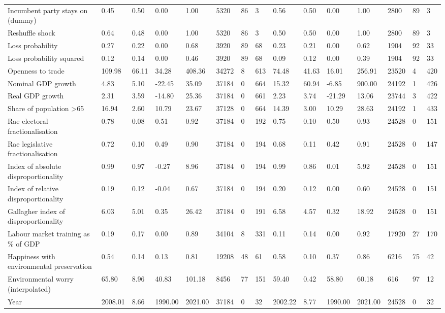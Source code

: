 \begin{longtable}{lllllllllllllll}
Incumbent party stays on (dummy) & 0.45 & 0.50 & 0.00 & 1.00 & 5320 & 86 & 3 & 0.56 & 0.50 & 0.00 & 1.00 & 2800 & 89 & 3\\
Reshuffle shock & 0.64 & 0.48 & 0.00 & 1.00 & 5320 & 86 & 3 & 0.50 & 0.50 & 0.00 & 1.00 & 2800 & 89 & 3\\
\addlinespace
Loss probability & 0.27 & 0.22 & 0.00 & 0.68 & 3920 & 89 & 68 & 0.23 & 0.21 & 0.00 & 0.62 & 1904 & 92 & 33\\
Loss probability squared & 0.12 & 0.14 & 0.00 & 0.46 & 3920 & 89 & 68 & 0.09 & 0.12 & 0.00 & 0.39 & 1904 & 92 & 33\\
Openness to trade & 109.98 & 66.11 & 34.28 & 408.36 & 34272 & 8 & 613 & 74.48 & 41.63 & 16.01 & 256.91 & 23520 & 4 & 420\\
Nominal GDP growth & 4.83 & 5.10 & -22.45 & 35.09 & 37184 & 0 & 664 & 15.32 & 60.94 & -6.85 & 900.00 & 24192 & 1 & 426\\
Real GDP growth & 2.31 & 3.59 & -14.80 & 25.36 & 37184 & 0 & 661 & 2.23 & 3.74 & -21.29 & 13.06 & 23744 & 3 & 422\\
\addlinespace
Share of population >65 & 16.94 & 2.60 & 10.79 & 23.67 & 37128 & 0 & 664 & 14.39 & 3.00 & 10.29 & 28.63 & 24192 & 1 & 433\\
Rae electoral fractionalisation & 0.78 & 0.08 & 0.51 & 0.92 & 37184 & 0 & 192 & 0.75 & 0.10 & 0.50 & 0.93 & 24528 & 0 & 151\\
Rae legislative fractionalisation & 0.72 & 0.10 & 0.49 & 0.90 & 37184 & 0 & 194 & 0.68 & 0.11 & 0.42 & 0.91 & 24528 & 0 & 147\\
Index of absolute disproportionality & 0.99 & 0.97 & -0.27 & 8.96 & 37184 & 0 & 194 & 0.99 & 0.86 & 0.01 & 5.92 & 24528 & 0 & 151\\
Index of relative disproportionality & 0.19 & 0.12 & -0.04 & 0.67 & 37184 & 0 & 194 & 0.20 & 0.12 & 0.00 & 0.60 & 24528 & 0 & 151\\
\addlinespace
Gallagher index of disproportionality & 6.03 & 5.01 & 0.35 & 26.42 & 37184 & 0 & 191 & 6.58 & 4.57 & 0.32 & 18.92 & 24528 & 0 & 151\\
Labour market training as \% of GDP & 0.19 & 0.17 & 0.00 & 0.89 & 34104 & 8 & 331 & 0.11 & 0.14 & 0.00 & 0.92 & 17920 & 27 & 170\\
Happiness with environmental preservation & 0.54 & 0.14 & 0.13 & 0.81 & 19208 & 48 & 61 & 0.58 & 0.10 & 0.37 & 0.86 & 6216 & 75 & 42\\
Environmental worry (interpolated) & 65.80 & 8.96 & 40.83 & 101.18 & 8456 & 77 & 151 & 59.40 & 0.42 & 58.80 & 60.18 & 616 & 97 & 12\\
Year & 2008.01 & 8.66 & 1990.00 & 2021.00 & 37184 & 0 & 32 & 2002.22 & 8.77 & 1990.00 & 2021.00 & 24528 & 0 & 32\\
\bottomrule
\end{longtable}
